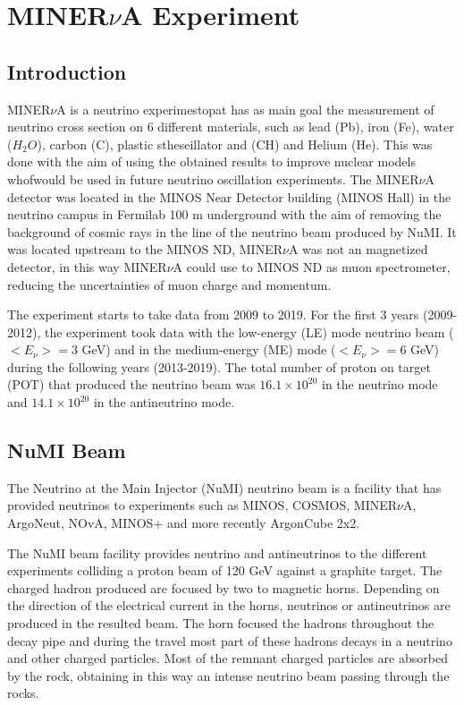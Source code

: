 \chapter{MINER$\nu$A Experiment}
\minitoc
\label{Cap:MnvExperiment}

\section{Introduction}
\label{Chap2:MnvExperiment:Intro}
MINER$\nu$A is a neutrino experimestopat has as main goal the measurement of neutrino cross section on 6 different materials, such as lead (Pb), iron (Fe), water ($H_2O$), carbon (C), plastic stheseillator and (CH) and Helium (He). This was done with the aim of using the obtained results to improve nuclear models whofwould be used in future neutrino oscillation experiments. The MINER$\nu$A detector was located in the MINOS Near Detector building (MINOS Hall) in the neutrino campus in Fermilab 100 m underground with the aim of removing the background of cosmic rays in the line of the neutrino beam produced by NuMI. It was located upstream to the MINOS ND, MINER$\nu$A was not an magnetized detector, in this way MINER$\nu$A could use to MINOS ND as muon spectrometer, reducing the uncertainties of muon charge and momentum.  

The experiment starts to take data from 2009 to 2019. For the first 3 years (2009-2012), the experiment took data with the low-energy (LE) mode neutrino beam ($<E_\nu>=3$ GeV) and in the medium-energy (ME) mode ($<E_\nu> = 6$ GeV) during the following years (2013-2019). The total number of proton on target (POT) that produced the neutrino beam was $16.1\times10^{20}$ in the neutrino mode and $14.1\times10^{20}$ in the antineutrino mode. 

\section{NuMI Beam}
\label{Cap:MnvExperiment:NuMI}
The Neutrino at the Main Injector \cite{Numi} (NuMI) neutrino beam is a facility that has provided neutrinos to experiments such as MINOS\cite{MINOS}, COSMOS\cite{COSMOS}, MINER$\nu$A\cite{MINERvA}, ArgoNeut\cite{ArgoNeuT}, NOvA\cite{NOvA}, MINOS+\cite{MINOS+} and more recently ArgonCube 2x2\cite{twobytwo}.

The NuMI beam facility provides neutrino and antineutrinos to the different experiments colliding a proton beam of 120 GeV against a graphite target. The charged hadron produced are focused by two to magnetic horns. Depending on the direction of the electrical current in the horns, neutrinos or antineutrinos are produced in the resulted beam. The horn focused the hadrons throughout the decay pipe and during the travel most part of these hadrons decays in a neutrino and other charged particles. Most of the remnant charged particles are absorbed by the rock, obtaining in this way an intense neutrino beam passing through the rocks.  

